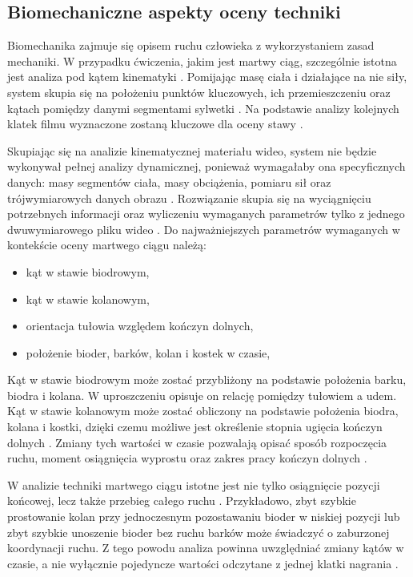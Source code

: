 \subsection{Biomechaniczne aspekty oceny techniki}

Biomechanika zajmuje się opisem ruchu człowieka z wykorzystaniem zasad mechaniki. W przypadku ćwiczenia, jakim jest martwy ciąg, szczególnie istotna jest analiza pod kątem kinematyki \cite{hanen2025deadlift}. Pomijając masę ciała i działające na nie siły, system skupia się na położeniu punktów kluczowych, ich przemieszczeniu oraz kątach pomiędzy danymi segmentami sylwetki \cite{wade2022markerless}. Na podstawie analizy kolejnych klatek filmu wyznaczone zostaną kluczowe dla oceny stawy \cite{mediapipe_pose_landmarker}.

Skupiając się na analizie kinematycznej materiału wideo, system nie będzie wykonywał pełnej analizy dynamicznej, ponieważ wymagałaby ona specyficznych danych: masy segmentów ciała, masy obciążenia, pomiaru sił oraz trójwymiarowych danych obrazu \cite{wade2022markerless,ramirez2022lowback}. Rozwiązanie skupia się na wyciągnięciu potrzebnych informacji oraz wyliczeniu wymaganych parametrów tylko z jednego dwuwymiarowego pliku wideo \cite{wade2022markerless}. Do najważniejszych parametrów wymaganych w kontekście oceny martwego ciągu należą:
\begin{itemize}
\item kąt w stawie biodrowym,
\item kąt w stawie kolanowym,
\item orientacja tułowia względem kończyn dolnych,
\item położenie bioder, barków, kolan i kostek w czasie,
\end{itemize}

Kąt w stawie biodrowym może zostać przybliżony na podstawie położenia barku, biodra i kolana. W uproszczeniu opisuje on relację pomiędzy tułowiem a udem. Kąt w stawie kolanowym może zostać obliczony na podstawie położenia biodra, kolana i kostki, dzięki czemu możliwe jest określenie stopnia ugięcia kończyn dolnych \cite{mediapipe_pose_docs,hanen2025deadlift}. Zmiany tych wartości w czasie pozwalają opisać sposób rozpoczęcia ruchu, moment osiągnięcia wyprostu oraz zakres pracy kończyn dolnych \cite{hanen2025deadlift}.

W analizie techniki martwego ciągu istotne jest nie tylko osiągnięcie pozycji końcowej, lecz także przebieg całego ruchu \cite{hanen2025deadlift}. Przykładowo, zbyt szybkie prostowanie kolan przy jednoczesnym pozostawaniu bioder w niskiej pozycji lub zbyt szybkie unoszenie bioder bez ruchu barków może świadczyć o zaburzonej koordynacji ruchu. Z tego powodu analiza powinna uwzględniać zmiany kątów w czasie, a nie wyłącznie pojedyncze wartości odczytane z jednej klatki nagrania \cite{mundt2024twodimensional}.

